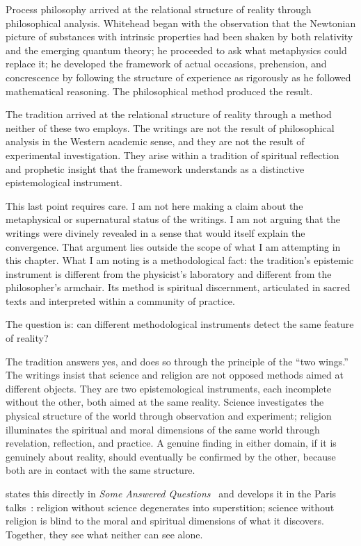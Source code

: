 Process philosophy arrived at the relational structure of reality through
philosophical analysis.
Whitehead began with the observation that the Newtonian picture of substances
with intrinsic properties had been shaken by both relativity and the emerging
quantum theory; he proceeded to ask what metaphysics could replace it; he developed
the framework of actual occasions, prehension, and concrescence by following the
structure of experience as rigorously as he followed mathematical reasoning.
The philosophical method produced the result.

The \bahai tradition arrived at the relational structure of reality through a
method neither of these two employs.
The \bahai writings are not the result of philosophical analysis in the Western
academic sense, and they are not the result of experimental investigation.
They arise within a tradition of spiritual reflection and prophetic insight that
the \bahai framework understands as a distinctive epistemological instrument.

This last point requires care.
I am not here making a claim about the metaphysical or supernatural status of the
\bahai writings.
I am not arguing that the writings were divinely revealed in a sense that would
itself explain the convergence.
That argument lies outside the scope of what I am attempting in this chapter.
What I am noting is a methodological fact: the \bahai tradition's epistemic
instrument is different from the physicist's laboratory and different from the
philosopher's armchair.
Its method is spiritual discernment, articulated in sacred texts and interpreted
within a community of practice.

The question is: can different methodological instruments detect the same feature
of reality?

The \bahai tradition answers yes, and does so through the principle of the ``two
wings.''
The \bahai writings insist that science and religion are not opposed methods aimed
at different objects.
They are two epistemological instruments, each incomplete without the other, both
aimed at the same reality.
Science investigates the physical structure of the world through observation and
experiment; religion illuminates the spiritual and moral dimensions of the same
world through revelation, reflection, and practice.
A genuine finding in either domain, if it is genuinely about reality, should
eventually be confirmed by the other, because both are in contact with the same
structure.

\AbdulBaha states this directly in \textit{Some Answered Questions}~\citep{SAQ}
and develops it in the Paris talks~\citep{ParisTalks}: religion without science
degenerates into superstition; science without religion is blind to the moral and
spiritual dimensions of what it discovers.
Together, they see what neither can see alone.

